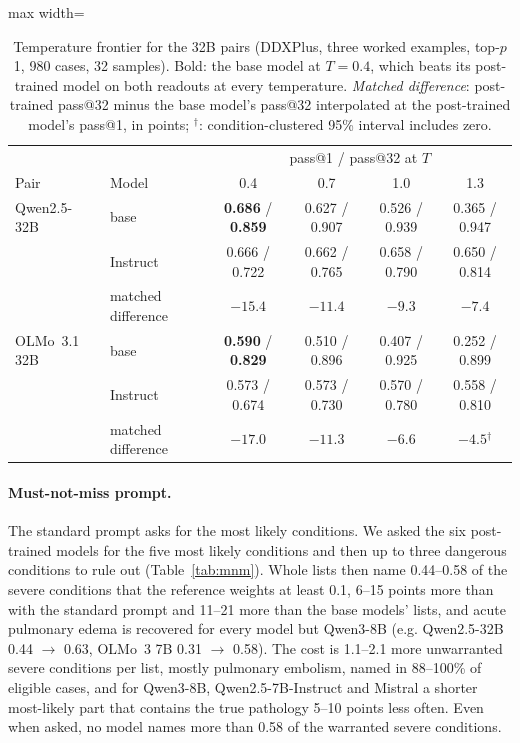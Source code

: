 \documentclass[wcp]{jmlr}
\begin{document}
\begin{table}[t]
\centering\small
\begin{adjustbox}{max width=\linewidth}
\begin{tabular}{llcccc}
\toprule
 & & \multicolumn{4}{c}{pass@1 / pass@32 at $T$} \\
Pair & Model & 0.4 & 0.7 & 1.0 & 1.3 \\
\midrule
Qwen2.5-32B & base & \textbf{0.686} / \textbf{0.859} & 0.627 / 0.907 & 0.526 / 0.939 & 0.365 / 0.947 \\
 & Instruct & 0.666 / 0.722 & 0.662 / 0.765 & 0.658 / 0.790 & 0.650 / 0.814 \\
 & matched difference & $-15.4$ & $-11.4$ & $-9.3$ & $-7.4$ \\
\midrule
OLMo~3.1 32B & base & \textbf{0.590} / \textbf{0.829} & 0.510 / 0.896 & 0.407 / 0.925 & 0.252 / 0.899 \\
 & Instruct & 0.573 / 0.674 & 0.573 / 0.730 & 0.570 / 0.780 & 0.558 / 0.810 \\
 & matched difference & $-17.0$ & $-11.3$ & $-6.6$ & $-4.5$$^{\dagger}$ \\
\bottomrule
\end{tabular}
\end{adjustbox}
\caption{Temperature frontier for the 32B pairs (DDXPlus, three worked examples, top-$p$ 1, 980 cases, 32 samples). Bold: the base model at $T{=}0.4$, which beats its post-trained model on both readouts at every temperature. \emph{Matched difference}: post-trained pass@32 minus the base model's pass@32 interpolated at the post-trained model's pass@1, in points; $^{\dagger}$: condition-clustered 95\% interval includes zero.}
\label{tab:frontier32}
\end{table}

\paragraph{Must-not-miss prompt.} The standard prompt asks for the most likely conditions. We asked the six post-trained models for the five most likely conditions and then up to three dangerous conditions to rule out (Table~\ref{tab:mnm}). Whole lists then name 0.44--0.58 of the severe conditions that the reference weights at least 0.1, 6--15 points more than with the standard prompt and 11--21 more than the base models' lists, and acute pulmonary edema is recovered for every model but Qwen3-8B (e.g. Qwen2.5-32B 0.44 $\rightarrow$ 0.63, OLMo~3 7B 0.31 $\rightarrow$ 0.58). The cost is 1.1--2.1 more unwarranted severe conditions per list, mostly pulmonary embolism, named in 88--100\% of eligible cases, and for Qwen3-8B, Qwen2.5-7B-Instruct and Mistral a shorter most-likely part that contains the true pathology 5--10 points less often. Even when asked, no model names more than 0.58 of the warranted severe conditions.
\end{document}
